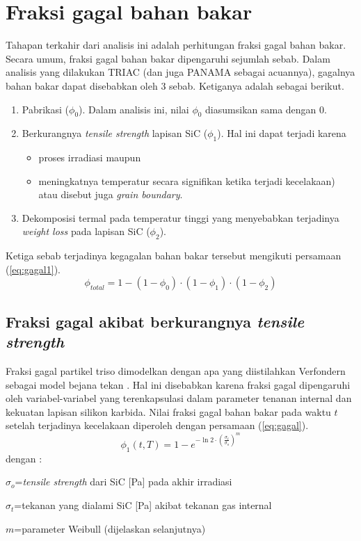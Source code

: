 \documentclass[a4paper,11pt]{report}
\begin{document}
\section{Fraksi gagal bahan bakar}
Tahapan terkahir dari analisis ini adalah perhitungan fraksi gagal bahan bakar. Secara umum, fraksi gagal bahan bakar dipengaruhi sejumlah sebab. Dalam analisis yang dilakukan TRIAC (dan juga PANAMA sebagai acuannya), gagalnya bahan bakar dapat disebabkan oleh 3 sebab. Ketiganya adalah sebagai berikut.
\begin{enumerate}
\item Pabrikasi ($\phi_0$). Dalam analisis ini, nilai $\phi_0$ diasumsikan sama dengan $0$.
\item Berkurangnya \textit{tensile strength} lapisan SiC ($\phi_1$). Hal ini dapat terjadi karena
\begin{itemize}
\item proses irradiasi maupun
\item meningkatnya temperatur secara signifikan ketika terjadi kecelakaan) atau disebut juga \textit{grain boundary}.
\end{itemize}  
\item Dekomposisi termal pada temperatur tinggi yang menyebabkan terjadinya \textit{weight loss} pada lapisan SiC ($\phi_2$).
\end{enumerate}

Ketiga sebab terjadinya kegagalan bahan bakar tersebut mengikuti persamaan (\ref{eq:gagal1}).
\begin{equation}
  \phi_{total}=1-(1-\phi_0) \cdot(1-\phi_1) \cdot (1-\phi_2)
  \label{eq:gagal1}
\end{equation}

\subsection{Fraksi gagal akibat berkurangnya \textit{tensile strength}}
Fraksi gagal partikel triso dimodelkan dengan apa yang diistilahkan Verfondern sebagai model bejana tekan \cite{report1}. Hal ini disebabkan karena  fraksi gagal dipengaruhi oleh variabel-variabel yang terenkapsulasi dalam parameter tenanan internal dan kekuatan lapisan silikon karbida. Nilai fraksi gagal bahan bakar pada waktu $t$ setelah terjadinya kecelakaan diperoleh dengan persamaan (\ref{eq:gagal}).
\begin{equation}
  \phi_1(t,T)=1-e^{-\ln 2 \cdot \left(\frac{\sigma_t}{\sigma_o}\right)^m}
  \label{eq:gagal}
\end{equation}
dengan :
\begin{description}
  \item $\sigma_o$=\textit{tensile strength} dari SiC [Pa] pada akhir irradiasi
  \item $\sigma_t$=tekanan yang dialami SiC [Pa] akibat tekanan gas internal
  \item $m$=parameter Weibull (dijelaskan selanjutnya)
\end{description}
\end{document}
